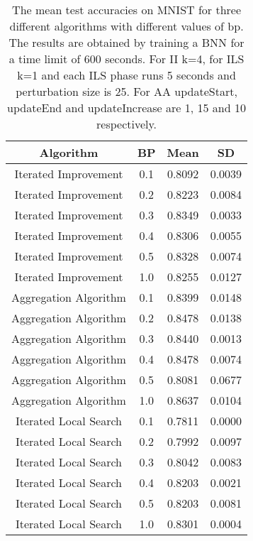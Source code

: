 \begin{center}
\begin{table}[H]
\centering
\begin{tabular}{|c|c|c|c|}
  \hline
Algorithm & BP & Mean & SD \\ 
  \hline
Iterated Improvement & 0.1 & 0.8092 & 0.0039 \\ 
   \hline
Iterated Improvement & 0.2 & 0.8223 & 0.0084 \\ 
   \hline
Iterated Improvement & 0.3 & 0.8349 & 0.0033 \\ 
   \hline
Iterated Improvement & 0.4 & 0.8306 & 0.0055 \\ 
   \hline
Iterated Improvement & 0.5 & 0.8328 & 0.0074 \\ 
   \hline
Iterated Improvement & 1.0 & 0.8255 & 0.0127 \\ 
   \hline
Aggregation Algorithm & 0.1 & 0.8399 & 0.0148 \\ 
   \hline
Aggregation Algorithm & 0.2 & 0.8478 & 0.0138 \\ 
   \hline
Aggregation Algorithm & 0.3 & 0.8440 & 0.0013 \\ 
   \hline
Aggregation Algorithm & 0.4 & 0.8478 & 0.0074 \\ 
   \hline
Aggregation Algorithm & 0.5 & 0.8081 & 0.0677 \\ 
   \hline
Aggregation Algorithm & 1.0 & 0.8637 & 0.0104 \\ 
   \hline
Iterated Local Search & 0.1 & 0.7811 & 0.0000 \\ 
   \hline
Iterated Local Search & 0.2 & 0.7992 & 0.0097 \\ 
   \hline
Iterated Local Search & 0.3 & 0.8042 & 0.0083 \\ 
   \hline
Iterated Local Search & 0.4 & 0.8203 & 0.0021 \\ 
   \hline
Iterated Local Search & 0.5 & 0.8203 & 0.0081 \\ 
   \hline
Iterated Local Search & 1.0 & 0.8301 & 0.0004 \\ 
   \hline
\end{tabular}
\caption{The mean test accuracies on MNIST for three different algorithms with different values of bp.
            The results are obtained by training a BNN for a time limit of 600 seconds. For II k=4, for
            ILS k=1 and each ILS phase runs 5 seconds and perturbation size is 25. For AA updateStart, updateEnd
            and updateIncrease are 1, 15 and 10 respectively. } 
\label{MBT_FTBP_CS_small}
\end{table}

\end{center}
